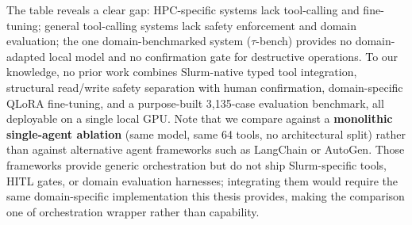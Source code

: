 The table reveals a clear gap: HPC-specific systems lack tool-calling and fine-tuning; general tool-calling systems lack safety enforcement and domain evaluation; the one domain-benchmarked system ($\tau$-bench) provides no domain-adapted local model and no confirmation gate for destructive operations. To our knowledge, no prior work combines Slurm-native typed tool integration, structural read/write safety separation with human confirmation, domain-specific QLoRA fine-tuning, and a purpose-built 3,135-case evaluation benchmark, all deployable on a single local GPU. Note that we compare against a \textbf{monolithic single-agent ablation} (same model, same 64 tools, no architectural split) rather than against alternative agent frameworks such as LangChain or AutoGen. Those frameworks provide generic orchestration but do not ship Slurm-specific tools, HITL gates, or domain evaluation harnesses; integrating them would require the same domain-specific implementation this thesis provides, making the comparison one of orchestration wrapper rather than capability.
